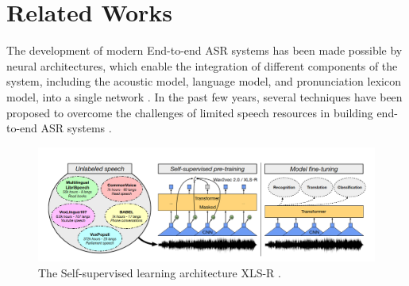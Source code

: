 \documentclass[runningheads]{llncs}
\begin{document}
% 





\section{Related Works}
\label{sec:relatedworks}

The development of modern End-to-end ASR systems has been made possible by neural architectures, which enable the integration of different components of the system, including the acoustic model, language model, and pronunciation lexicon model, into a single network \cite{georgescu2021performance}. 
In the past  few years, several  techniques have been proposed to overcome the challenges of limited speech resources in building end-to-end ASR systems \cite{barrault2023seamless,pratap2024scaling,whisper} .


\begin{figure}[htpb]
    \includegraphics[width=\textwidth]{XLS-R.png}
    \caption{The Self-supervised learning architecture XLS-R \cite{babu2021xls}.} \label{XLS-R}
\end{figure}
\end{document}
